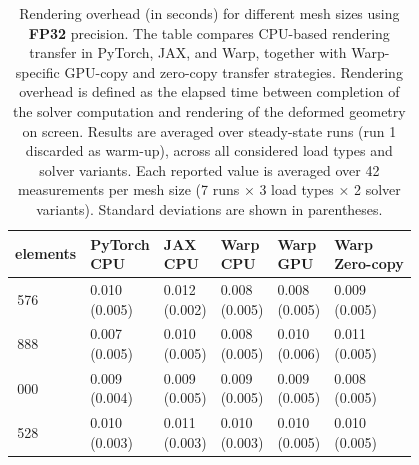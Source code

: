\begin{table}[H]\centering\begin{tabular}{>{\centering\arraybackslash}m{2.0cm}|>{\centering\arraybackslash}m{1.9cm}>{\centering\arraybackslash}m{1.9cm}>{\centering\arraybackslash}m{1.9cm}>{\centering\arraybackslash}m{1.9cm}>{\centering\arraybackslash}m{1.9cm}}
\toprule
elements & \makecell{PyTorch\\CPU} & \makecell{JAX\\CPU} & \makecell{Warp\\CPU} & \makecell{Warp\\GPU} & \makecell{Warp\\Zero-copy} \\
\midrule
24\,576 & \makecell{0.010 \\[-4pt] (0.005)} & \makecell{0.012 \\[-4pt] (0.002)} & \makecell{0.008 \\[-4pt] (0.005)} & \makecell{0.008 \\[-4pt] (0.005)} & \makecell{0.009 \\[-4pt] (0.005)} \\
63\,888 & \makecell{0.007 \\[-4pt] (0.005)} & \makecell{0.010 \\[-4pt] (0.005)} & \makecell{0.008 \\[-4pt] (0.005)} & \makecell{0.010 \\[-4pt] (0.006)} & \makecell{0.011 \\[-4pt] (0.005)} \\
162\,000 & \makecell{0.009 \\[-4pt] (0.004)} & \makecell{0.009 \\[-4pt] (0.005)} & \makecell{0.009 \\[-4pt] (0.005)} & \makecell{0.009 \\[-4pt] (0.005)} & \makecell{0.008 \\[-4pt] (0.005)} \\
444\,528 & \makecell{0.010 \\[-4pt] (0.003)} & \makecell{0.011 \\[-4pt] (0.003)} & \makecell{0.010 \\[-4pt] (0.003)} & \makecell{0.010 \\[-4pt] (0.005)} & \makecell{0.010 \\[-4pt] (0.005)} \\
\bottomrule
\end{tabular}\caption{Rendering overhead (in seconds) for different mesh sizes using \textbf{FP32} precision. The table compares CPU-based rendering transfer in PyTorch, JAX, and Warp, together with Warp-specific GPU-copy and zero-copy transfer strategies. Rendering overhead is defined as the elapsed time between completion of the solver computation and rendering of the deformed geometry on screen. Results are averaged over steady-state runs (run 1 discarded as warm-up), across all considered load types and solver variants. Each reported value is averaged over 42 measurements per mesh size (7 runs × 3 load types × 2 solver variants). Standard deviations are shown in parentheses.}\label{tab:rendering_overhead_combined_fp32}\end{table}

